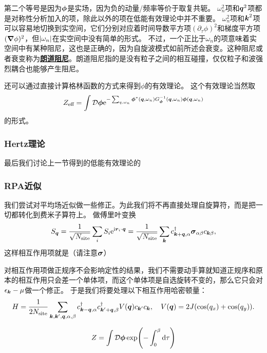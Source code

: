 \documentclass[hyperref, UTF8, a4paper]{ctexart}
\newcommand*{\ii}{\mathrm{i}}
\newcommand*{\ee}{\mathrm{e}}
\newcommand*{\fd}[1]{\mathcal{D} #1}
\newcommand*{\concept}[1]{\underline{\textbf{#1}}}
\begin{document}
第二个等号是因为$\vb*{\phi}$是实场，因为负的动量/频率等价于取复共轭。
$\omega_n^2$项和$\vb*{q}^2$项都是对称性分析加入的项，除此以外的项在低能有效理论中并不重要。%
$\omega_n^2$项和$\vb*{k}^2$项可以容易地切换到实空间，它们分别对应着时间导数平方项$(\partial_\tau \phi)^2$和梯度平方项$(\grad{\phi})^2$，但$\abs{\omega_n}$在实空间中没有简单的形式。
不过，一个正比于$\omega_n$的项意味着实空间中有某种阻尼，这也是正确的，因为自旋波模式如前所述会衰变。这种阻尼或者衰变称为\concept{朗道阻尼}。朗道阻尼指的是没有粒子之间的相互碰撞，仅仅粒子和波强烈耦合也能够产生阻尼。

还可以通过直接计算格林函数的方式来得到$\phi$的有效理论。
这个有效理论当然取
\[
    Z_\text{eff} = \int \mathcal{D}\vb*{\phi} \ee^{- \sum_{q, \omega_n} \vb*{\phi}^*(\vb*{q}, \omega_n) G^{-1}_{\vb*{\phi}}(\vb*{q}, \omega_n) \vb*{\phi}(\vb*{q}, \omega_n)}
\]
的形式。

\subsubsection{Hertz理论}

最后我们讨论上一节得到的低能有效理论的

\subsubsection{RPA近似}

我们尝试对平均场近似做一些修正。为此我们将不再直接处理自旋算符，而是把一切都转化到费米子算符上。
做傅里叶变换
\[
    {S}_{\vb*{q}} = \frac{1}{\sqrt{N_\text{site}}} \sum_i {S}_i \ee^{\ii \vb*{r}_i \cdot \vb*{q}} = \frac{1}{\sqrt{N_\text{site}}} \sum_{\vb*{k}} {c}^\dagger_{\vb*{k}+\vb*{q}, \alpha} \vb*{\sigma}_{\alpha \beta} {c}_{\vb*{k} \beta},
\]
这样相互作用项就是（请注意$\vb*{\sigma}$）

对相互作用项做正规序不会影响定性的结果，我们不需要动手算就知道正规序和原本的相互作用只会差一个单体项，而这个单体项是自选旋转不变的，那么它只会对$\epsilon_{\vb*{k}} - \mu$做一个修正。
于是我们将要处理以下相互作用哈密顿量：%
\begin{equation}
    {H} = \frac{1}{2 N_\text{site}} \sum_{\vb*{k}, \vb*{k}', \vb*{q}, \alpha, \beta} {c}^\dagger_{\vb*{k}-\vb*{q}, \alpha} {c}^\dagger_{\vb*{k}'+\vb*{q}, \beta} V(\vb*{q}) {c}_{\vb*{k}'} {c}_{\vb*{k}}, \quad V(\vb*{q}) = 2 J (\cos(q_x) + \cos(q_y)).
\end{equation}

\begin{equation}
    Z = \int \fd{\vb*{\phi}} \exp(- \int_0^\beta \dd{\tau} )
\end{equation}
\end{document}
